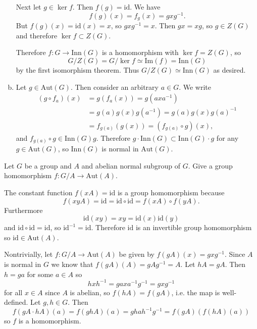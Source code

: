 \documentclass{article}
\newcounter{Problem}
\newenvironment{Problem}{\begin{Exercise}[name={Problem},
                                          counter={Problem}]}
                        {\end{Exercise}}
\begin{document}
\begin{Answer}
\begin{enumerate}[(a)]
{            Next let $g \in \ker f$. Then $f(g) = \mathrm{id}$. We have
            $$
            f(g)(x) = f_g(x) = g x g^{-1}.
            $$
            But $f(g)(x) = \mathrm{id}(x) = x$, so $g x g^{-1} =
            x$. Then $g x = x g$, so $g \in Z(G)$
            and therefore $\ker f \subset Z(G)$.

            Therefore $f: G \to \mathrm{Inn}(G)$ is a homomorphism
            with $\ker f = Z(G)$, so
            $$
            G / Z(G) = G / \ker f \simeq \mathrm{Im}(f) = \mathrm{Inn}(G)
            $$
            by the first isomorphism theorem.
            Thus $G / Z(G) \simeq \mathrm{Inn}(G)$ as desired.
           }
      \item{
        Let $g \in \mathrm{Aut}(G)$.
        Then consider an arbitrary $a \in G$. We write
        \begin{align*}
          (g \circ f_a)(x)
            &= g(f_a(x)) = g(a x a^{-1}) \\
            &= g(a) g(x) g(a^{-1})
             = g(a) g(x) g(a)^{-1} \\
            &= f_{g(a)}(g(x))
             = (f_{g(a)} \circ g)(x),
        \end{align*}
        and $f_{g(a)} \circ g \in \mathrm{Inn}(G) g$. Therefore
        $g \cdot \mathrm{Inn}(G) \subset \mathrm{Inn}(G) \cdot g$ for any
        $g \in \mathrm{Aut}(G)$, so $\mathrm{Inn}(G)$ is normal
        in $\mathrm{Aut}(G)$.
      }
\end{enumerate}
\end{Answer}

\pagebreak

\begin{Problem}
Let $G$ be a group and $A$ and abelian normal subgroup of $G$. Give a
group homomorphism $f : G/A \to \mathrm{Aut}(A)$.
\end{Problem}

\begin{Answer}
The constant function $f(xA) = \mathrm{id}$ is a group homomorphism
because
$$
f(xyA) = \mathrm{id}
       = \mathrm{id} \circ \mathrm{id}
       = f(xA) \circ f(yA).
$$
Furthermore
$$
\mathrm{id}(x y) = x y = \mathrm{id}(x) \mathrm{id}(y)
$$
and $\mathrm{id} \circ \mathrm{id} = \mathrm{id}$, so
$\mathrm{id}^{-1} = \mathrm{id}$. Therefore $\mathrm{id}$ is an
invertible group homomorphism so $\mathrm{id} \in \mathrm{Aut}(A)$.

Nontrivially, let $f : G / A \to \mathrm{Aut}(A)$ be given by
$f(gA)(x) = gxg^{-1}$. Since $A$ is normal in $G$ we know that
$f(gA)(A) = gAg^{-1} = A$. Let $hA = gA$. Then $h = ga$ for some
$a \in A$ so
$$
hxh^{-1} = gaxa^{-1}g^{-1} = gxg^{-1}
$$
for all $x \in A$ since $A$ is abelian,
so $f(hA) = f(gA)$, i.e. the map is well-defined.
Let $g, h \in G$. Then
$$
f(gA \cdot hA)(a) = f(ghA)(a) = ghah^{-1}g^{-1} = f(gA)(f(hA)(a))
$$
so $f$ is a homomorphism.
\end{Answer}
\end{document}
